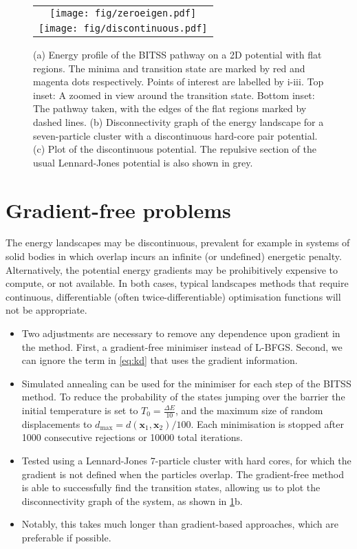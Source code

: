 \documentclass[aps,twocolumn]{revtex4}
\begin{document}
\begin{figure}[htb]
  \centering
  \begin{tabular}[b]{c}
    \texttt{[image: fig/zeroeigen.pdf]}\\
    \texttt{[image: fig/discontinuous.pdf]}
  \end{tabular}
  \caption{(a) Energy profile of the BITSS pathway on a 2D potential with flat regions. The minima and transition state are marked by red and magenta dots respectively. Points of interest are labelled by i-iii. Top inset: A zoomed in view around the transition state. Bottom inset: The pathway taken, with the edges of the flat regions marked by dashed lines. (b) Disconnectivity graph of the energy landscape for a seven-particle cluster with a discontinuous hard-core pair potential. (c) Plot of the discontinuous potential. The repulsive section of the usual Lennard-Jones potential is also shown in grey.}
  \label{fig:flatdiscontinuous}
\end{figure}


\section{Gradient-free problems}
The energy landscapes may be discontinuous, prevalent for example in systems of solid bodies in which overlap incurs an infinite (or undefined) energetic penalty. Alternatively, the potential energy gradients may be prohibitively expensive to compute, or not available. In both cases, typical landscapes methods that require continuous, differentiable (often twice-differentiable) optimisation functions will not be appropriate.

\begin{itemize}
\item
Two adjustments are necessary to remove any dependence upon gradient in the method. First, a gradient-free minimiser instead of L-BFGS. Second, we can ignore the term in \cref{eq:kd} that uses the gradient information.
\item
Simulated annealing can be used for the minimiser for each step of the BITSS method.
To reduce the probability of the states jumping over the barrier the initial temperature is set to $T_0 = \frac{\Delta E}{10}$, and the maximum size of random displacements to $d_\text{max} = d(\bm{x}_1, \bm{x}_2) / 100$.
Each minimisation is stopped after 1000 consecutive rejections or 10000 total iterations.
\item
Tested using a Lennard-Jones 7-particle cluster with hard cores, for which the gradient is not defined when the particles overlap.
The gradient-free method is able to successfully find the transition states, allowing us to plot the disconnectivity graph of the system, as shown in \cref{fig:flatdiscontinuous}b.
\item
Notably, this takes much longer than gradient-based approaches, which are preferable if possible.
\end{itemize}
\end{document}
